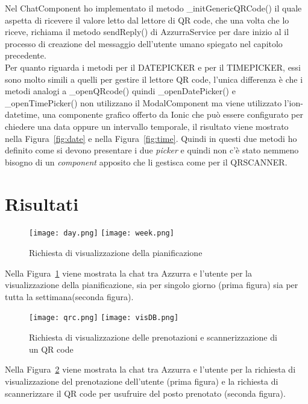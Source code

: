   Nel ChatComponent ho implementato il metodo \_initGenericQRCode() il quale aspetta di ricevere il valore letto dal lettore di \gls{QR code}\ap{[g]}, che una volta che lo riceve, richiama il metodo sendReply() di AzzurraService per dare inizio al il processo di creazione del messaggio dell'utente umano spiegato nel capitolo precedente. \\
  
  Per quanto riguarda i metodi per il DATEPICKER e per il TIMEPICKER, essi sono molto simili a quelli per gestire il lettore \gls{QR code}\ap{[g]}, l'unica differenza è che i metodi analogi a \_openQRcode() quindi \_openDatePicker() e \_openTimePicker() non utilizzano il ModalComponent ma viene utilizzato l'ion-datetime, una componente grafico offerto da Ionic che può essere configurato per chiedere una data oppure un intervallo temporale, il risultato viene mostrato nella Figura~\ref{fig:date} e nella Figura~\ref{fig:time}. Quindi in questi due metodi ho definito come si devono presentare i due \emph{picker} e quindi non c'è stato nemmeno bisogno di un \emph{component} apposito che li gestisca come per il QRSCANNER. 
\section{Risultati}
\begin{figure}[h]
	\begin{center}
		\texttt{[image: day.png]}\hfil
		\texttt{[image: week.png]}
		\caption{Richiesta di visualizzazione della pianificazione}\label{fig:planning}
	\end{center}
\end{figure}

Nella Figura~\ref{fig:planning} viene mostrata la chat tra Azzurra e l'utente per la visualizzazione della pianificazione, sia per singolo giorno (prima figura) sia per tutta la settimana(seconda figura).\\

\begin{figure}[h]
	\begin{center}
		\texttt{[image: qrc.png]}\hfil
		\texttt{[image: visDB.png]}
		\caption{Richiesta di visualizzazione delle prenotazioni e scannerizzazione di un QR code}\label{fig:QRc}
	\end{center}
\end{figure}\clearpage

Nella Figura~\ref{fig:QRc} viene mostrata la chat tra Azzurra e l'utente per la richiesta di visualizzazione del prenotazione dell'utente (prima figura) e la richiesta di scannerizzare il \gls{QR code}\ap{[g]} per usufruire del posto prenotato (seconda figura).\\


